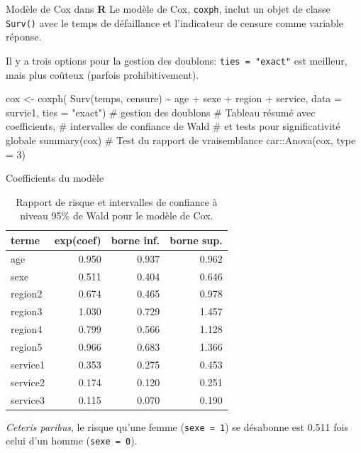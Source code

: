 \documentclass[
  ignorenonframetext,
]{beamer}
\newenvironment{Shaded}{\begin{snugshade}}{\end{snugshade}}
\newcommand{\AttributeTok}[1]{\textcolor[rgb]{0.40,0.45,0.13}{#1}}
\newcommand{\CommentTok}[1]{\textcolor[rgb]{0.37,0.37,0.37}{#1}}
\newcommand{\DecValTok}[1]{\textcolor[rgb]{0.68,0.00,0.00}{#1}}
\newcommand{\FunctionTok}[1]{\textcolor[rgb]{0.28,0.35,0.67}{#1}}
\newcommand{\NormalTok}[1]{\textcolor[rgb]{0.00,0.23,0.31}{#1}}
\newcommand{\OtherTok}[1]{\textcolor[rgb]{0.00,0.23,0.31}{#1}}
\newcommand{\SpecialCharTok}[1]{\textcolor[rgb]{0.37,0.37,0.37}{#1}}
\newcommand{\StringTok}[1]{\textcolor[rgb]{0.13,0.47,0.30}{#1}}
\begin{document}
\begin{frame}[fragile]{Modèle de Cox dans \textbf{R}}
\protect{}\label{moduxe8le-de-cox-dans-r}
Le modèle de Cox, \texttt{coxph}, inclut un objet de classe
\texttt{Surv()} avec le temps de défaillance et l'indicateur de censure
comme variable réponse.

Il y a trois options pour la gestion des doublons:
\texttt{ties\ =\ "exact"} est meilleur, mais plus coûteux (parfois
prohibitivement).

\begin{Shaded}
\begin{Highlighting}[numbers=left,,]
\NormalTok{cox }\OtherTok{\textless{}{-}} \FunctionTok{coxph}\NormalTok{(}
  \FunctionTok{Surv}\NormalTok{(temps, censure) }\SpecialCharTok{\textasciitilde{}} 
\NormalTok{    age }\SpecialCharTok{+}\NormalTok{ sexe }\SpecialCharTok{+}\NormalTok{ region }\SpecialCharTok{+}\NormalTok{ service, }
  \AttributeTok{data =}\NormalTok{ survie1,}
  \AttributeTok{ties =} \StringTok{"exact"}\NormalTok{) }\CommentTok{\# gestion des doublons}
\CommentTok{\# Tableau résumé avec coefficients,}
\CommentTok{\# intervalles de confiance de Wald}
\CommentTok{\# et tests pour significativité globale}
\FunctionTok{summary}\NormalTok{(cox)}
\CommentTok{\# Test du rapport de vraisemblance}
\NormalTok{car}\SpecialCharTok{::}\FunctionTok{Anova}\NormalTok{(cox, }\AttributeTok{type =} \DecValTok{3}\NormalTok{)}
\end{Highlighting}
\end{Shaded}
\end{frame}

\begin{frame}[fragile]{Coefficients du modèle}
\protect{}\label{coefficients-du-moduxe8le}
\begin{longtable}[t]{lrrr}

\caption{\label{tbl-survie5-coefs}Rapport de risque et intervalles de
confiance à niveau 95\% de Wald pour le modèle de Cox.}

\tabularnewline

\toprule
terme & exp(coef) & borne inf. & borne sup.\\
\midrule
age & 0.950 & 0.937 & 0.962\\
sexe & 0.511 & 0.404 & 0.646\\
region2 & 0.674 & 0.465 & 0.978\\
region3 & 1.030 & 0.729 & 1.457\\
region4 & 0.799 & 0.566 & 1.128\\
\addlinespace
region5 & 0.966 & 0.683 & 1.366\\
service1 & 0.353 & 0.275 & 0.453\\
service2 & 0.174 & 0.120 & 0.251\\
service3 & 0.115 & 0.070 & 0.190\\
\bottomrule

\end{longtable}

\emph{Ceteris paribus}, le risque qu'une femme (\texttt{sexe\ =\ 1}) se
désabonne est 0.511 fois celui d'un homme (\texttt{sexe\ =\ 0}).
\end{frame}
\end{document}
